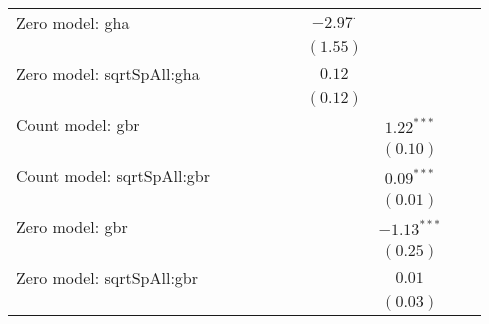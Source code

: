\begin{center}
\begin{longtable}{l c c c c c c c c c}
Zero model: gha                &               &               &               &               &                 & $-2.97^{\cdot}$ &               &                &               \\
                               &               &               &               &               &                 & $(1.55)$        &               &                &               \\
Zero model: sqrtSpAll:gha      &               &               &               &               &                 & $0.12$          &               &                &               \\
                               &               &               &               &               &                 & $(0.12)$        &               &                &               \\
Count model: gbr               &               &               &               &               &                 &                 & $1.22^{***}$  &                &               \\
                               &               &               &               &               &                 &                 & $(0.10)$      &                &               \\
Count model: sqrtSpAll:gbr     &               &               &               &               &                 &                 & $0.09^{***}$  &                &               \\
                               &               &               &               &               &                 &                 & $(0.01)$      &                &               \\
Zero model: gbr                &               &               &               &               &                 &                 & $-1.13^{***}$ &                &               \\
                               &               &               &               &               &                 &                 & $(0.25)$      &                &               \\
Zero model: sqrtSpAll:gbr      &               &               &               &               &                 &                 & $0.01$        &                &               \\
                               &               &               &               &               &                 &                 & $(0.03)$      &                &               \\

\end{longtable}
\end{center}
